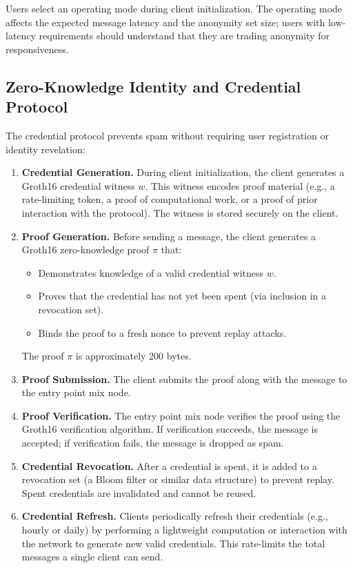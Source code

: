 \documentclass[11pt]{article}
\theoremstyle{definition}
\theoremstyle{remark}
\begin{document}
Users select an operating mode during client initialization. The operating mode affects the expected message latency and the anonymity set size; users with low-latency requirements should understand that they are trading anonymity for responsiveness.

\subsection{Zero-Knowledge Identity and Credential Protocol}
\label{subsec:zk}

The credential protocol prevents spam without requiring user registration or identity revelation:

\begin{enumerate}
    \item \textbf{Credential Generation.} During client initialization, the client generates a Groth16 credential witness $w$. This witness encodes proof material (e.g., a rate-limiting token, a proof of computational work, or a proof of prior interaction with the protocol). The witness is stored securely on the client.

    \item \textbf{Proof Generation.} Before sending a message, the client generates a Groth16 zero-knowledge proof $\pi$ that:
    \begin{itemize}
        \item Demonstrates knowledge of a valid credential witness $w$.
        \item Proves that the credential has not yet been spent (via inclusion in a revocation set).
        \item Binds the proof to a fresh nonce to prevent replay attacks.
    \end{itemize}
    The proof $\pi$ is approximately 200 bytes.

    \item \textbf{Proof Submission.} The client submits the proof along with the message to the entry point mix node.

    \item \textbf{Proof Verification.} The entry point mix node verifies the proof using the Groth16 verification algorithm. If verification succeeds, the message is accepted; if verification fails, the message is dropped as spam.

    \item \textbf{Credential Revocation.} After a credential is spent, it is added to a revocation set (a Bloom filter or similar data structure) to prevent replay. Spent credentials are invalidated and cannot be reused.

    \item \textbf{Credential Refresh.} Clients periodically refresh their credentials (e.g., hourly or daily) by performing a lightweight computation or interaction with the network to generate new valid credentials. This rate-limits the total messages a single client can send.
\end{enumerate}
\end{document}
